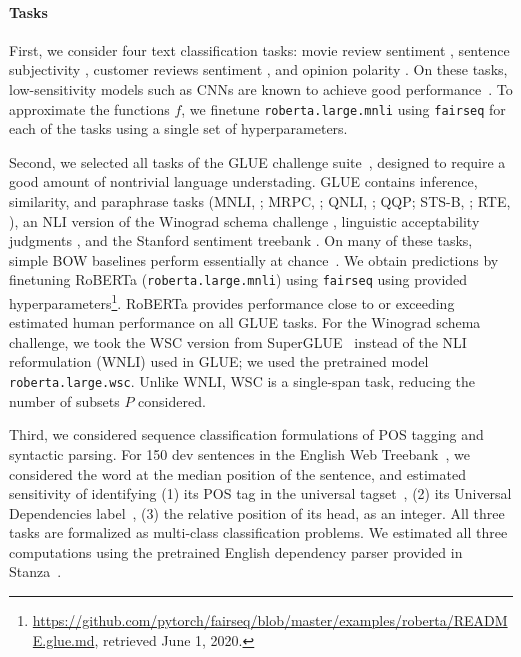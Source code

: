 \documentclass[11pt,a4paper]{article}
\begin{document}
\paragraph{Tasks}
First, we consider four text classification tasks: movie review sentiment \citep[MR,][]{pang2005seeing}, sentence subjectivity \citep[SUBJ,][]{pang2004a}, customer reviews sentiment \citep[CR,][]{hu2004mining}, %
and opinion polarity \citep[MPQA,][]{wiebe2005annotating}. %
On these tasks, low-sensitivity models such as CNNs are known to achieve good performance~\citep{kim2014convolutional}.
To approximate the functions $f$, we finetune \texttt{roberta.large.mnli} using \texttt{fairseq} for each of the tasks using a single set of hyperparameters.


Second, we selected all tasks of the GLUE challenge suite~\citep{wang2019glue}, designed to require a good amount of nontrivial language understading.
GLUE contains inference, similarity, and paraphrase tasks (MNLI, \citet{williams2018a}; MRPC, \citet{dolan2005automatically}; QNLI, \citet{rajpurkar2016squad}; QQP; STS-B, \citet{cer2017semeval}; RTE, \citet{dagan2009recognizing}), an NLI version of the Winograd schema challenge \citep{levesque2012the}, linguistic acceptability judgments \citep[CoLA,][]{warstadt2019neural}, and the Stanford sentiment treebank \citep[SST-2,][]{socher2013recursive}.
On many of these tasks, simple BOW baselines perform essentially at chance~\citep{wang2019glue}.
We obtain predictions by finetuning RoBERTa (\texttt{roberta.large.mnli}) using \texttt{fairseq} \citep{ott2019fairseq} using provided hyperparameters\footnote{\url{https://github.com/pytorch/fairseq/blob/master/examples/roberta/README.glue.md}, retrieved June 1, 2020.}.
RoBERTa provides performance close to or exceeding estimated human performance on all GLUE tasks. %
For the Winograd schema challenge, we took the WSC version from SuperGLUE~\citep{wang2019superglue} instead of the NLI reformulation (WNLI) used in GLUE; we used the pretrained model \texttt{roberta.large.wsc}. %
Unlike WNLI, WSC is a single-span task, reducing the number of subsets $P$ considered. %

Third, we considered sequence classification formulations of POS tagging and syntactic parsing.
For 150 dev sentences in the English Web Treebank~\citep{silveira2014a}, we considered the word at the median position of the sentence, and estimated sensitivity of identifying (1) its POS tag in the universal tagset~\citep{petrov2012a}, (2) its Universal Dependencies label~\citep{nivre2016universal}, (3) the relative position of its head, as an integer.
All three tasks are formalized as multi-class classification problems.
We estimated all three computations using the pretrained English dependency parser provided in Stanza~\citep{qi2018universal,qi2020stanza}.
\end{document}

